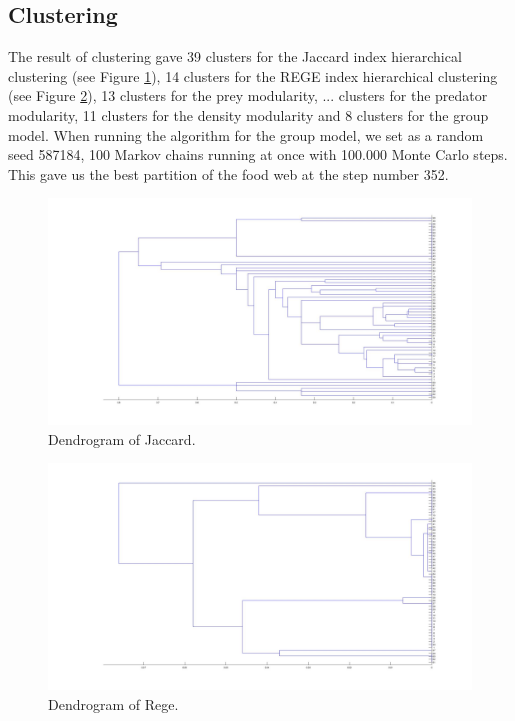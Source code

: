 \documentclass[twocolumn]{article}
\begin{document}
	\subsection*{Clustering}
	The result of clustering gave 39 clusters for the Jaccard index hierarchical clustering (see Figure \ref{fig:jaccarddendrogram}), 14 clusters for the REGE index hierarchical clustering (see Figure \ref{fig:regedendrogram}), 13 clusters for the prey modularity, ... clusters for the predator modularity, 11 clusters for the density modularity and 8 clusters for the group model. When running the algorithm for the group model, we set as a random seed 587184, 100 Markov chains running at once with 100.000 Monte Carlo steps. This gave us the best partition of the food web at the step number 352.
		\begin{figure}[htbp]%
			\centering
			\includegraphics[width=.8\linewidth]{dendrogram_jaccard.jpg}
			\caption{Dendrogram of Jaccard.}
			\label{fig:jaccarddendrogram}
		\end{figure}
		\begin{figure}[htbp]%
			\centering
			\includegraphics[width=.8\linewidth]{dendrogram_rege.jpg}
			\caption{Dendrogram of Rege.}
			\label{fig:regedendrogram}
		\end{figure}
\end{document}
